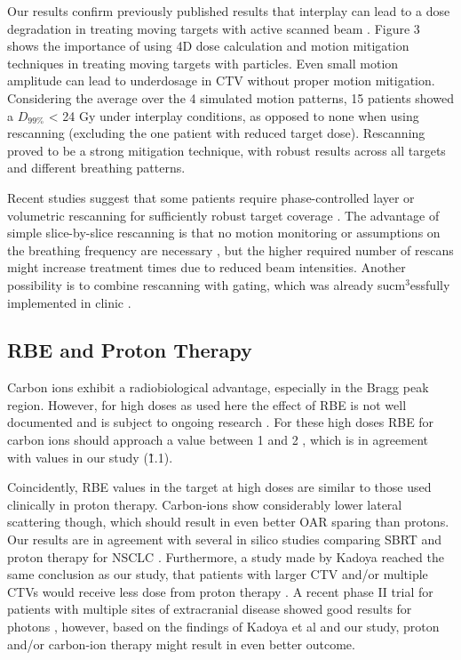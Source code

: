 \documentclass[type=dr, dr=rernat, acm$^3$entcolor=tud7b,colorbacktitle, bigchapter, openright, twoside, 12pt ]{tudthesis}
\begin{document}
Our results confirm previously published results that interplay can lead to a dose degradation in treating moving targets with active scanned beam \cite{Bert2008}. 
Figure 3 shows the importance of using 4D dose calculation and motion mitigation techniques in treating moving targets with particles. 
Even small motion amplitude can lead to underdosage in CTV without proper motion mitigation. Considering the average over the 4 simulated motion patterns, 15 patients showed a $D_{99\%}$ < 24 Gy under interplay 
conditions, as opposed to none when using rescanning (excluding the one patient with reduced target dose). Rescanning proved to be a strong mitigation technique, with robust results across all targets and different breathing patterns.

Recent studies suggest that some patients require phase-controlled layer or volumetric rescanning for sufficiently robust target coverage \cite{Mori2013,Takahashi2014}. 
The advantage of simple slice-by-slice rescanning is that no motion monitoring or assumptions on the breathing frequency are necessary \cite{Bert2011}, but the higher required number of rescans 
might increase treatment times due to reduced beam intensities. Another possibility is to combine rescanning with gating, which was already sucm$^{3}$essfully implemented in clinic \cite{Rossi2016}.




\subsection{RBE and Proton Therapy}

Carbon ions exhibit a radiobiological advantage, especially in the Bragg peak region. However, for high doses as used here the effect of RBE is not well documented and is subject to ongoing research \cite{Friedrich2014}. 
For these high doses RBE for carbon ions should approach a value between 1 and 2 \cite{Carabe2007}, which is in agreement with values in our study (\~ 1.1).

Coincidently, RBE values in the target at high doses are similar to those used clinically in proton therapy. Carbon-ions show considerably lower lateral scattering though, which should result in even better 
OAR sparing than protons. Our results are in agreement with several in silico studies comparing SBRT and proton therapy for NSCLC \cite{Roelofs2012, Kadoya2010, Register2010}. 
Furthermore, a study made by Kadoya reached the same conclusion as our study, that patients with larger CTV and/or multiple CTVs would  receive less dose from proton therapy \cite{Kadoya2010}.
A recent phase II trial for patients with multiple sites of extracranial disease showed good results for photons \cite{Iyengar2014}, however, based on the findings of Kadoya et al and our study, 
proton and/or carbon-ion therapy might result in even better outcome. 
\end{document}
